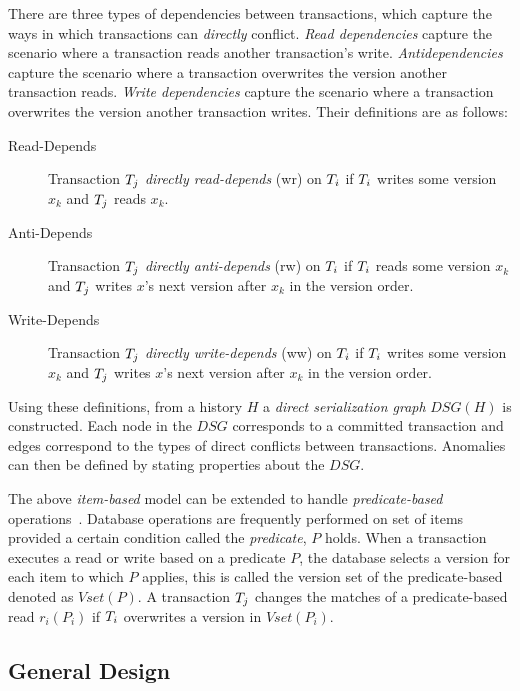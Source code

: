 There are three types of dependencies between transactions, which capture the ways in which transactions can \emph{directly} conflict.
\emph{Read dependencies} capture the scenario where a transaction reads another transaction's write.
\emph{Antidependencies} capture the scenario where a transaction overwrites the version another transaction reads.
\emph{Write dependencies} capture the scenario where a transaction overwrites the version another transaction writes. Their definitions are as follows:

\begin{description}
  \item[Read-Depends]
    Transaction $T_j$ \emph{directly read-depends} (\textsf{wr}) on $T_i$ if $T_i$ writes some version $x_k$ and $T_j$ reads $x_k$.
  \item[Anti-Depends]
    Transaction $T_j$ \emph{directly anti-depends} (\textsf{rw}) on $T_i$ if $T_i$ reads some version $x_k$ and $T_j$ writes $x$'s next version after $x_k$ in the version order.
  \item[Write-Depends]
    Transaction $T_j$ \emph{directly write-depends} (\textsf{ww}) on $T_i$ if $T_i$ writes some version $x_k$ and $T_j$ writes $x$'s next version after $x_k$ in the version order.
\end{description}


Using these definitions, from a history $H$ a \emph{direct serialization graph} $\textit{DSG}(H)$ is constructed.
Each node in the $\textit{DSG}$ corresponds to a committed transaction and edges correspond to the types of direct conflicts between transactions.
Anomalies can then be defined by stating properties about the $\textit{DSG}$.

The above \emph{item-based} model can be extended to handle \emph{predicate-based} operations~\cite{adya1999weak}.
Database operations are frequently performed on set of items provided a certain condition called the \emph{predicate}, $P$ holds.
When a transaction executes a read or write based on a predicate $P$, the database selects a version for each
item to which $P$ applies, this is called the version set of the predicate-based denoted as $\textit{Vset}(P)$.
A transaction $T_j$ changes the matches of a predicate-based read $r_i(P_i)$ if $T_i$ overwrites a version in $\textit{Vset}(P_i)$.

\subsection{General Design}
\label{sec:design-cons}


